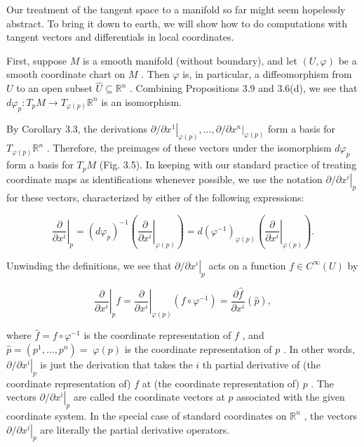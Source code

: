 \begin{definition}
\label{def:3-15-extra-1}
\leanok
{}
Our treatment of the tangent space to a manifold so far might seem hopelessly abstract. To bring it down to earth, we will show how to do computations with tangent vectors and differentials in local coordinates.

First, suppose $M$ is a smooth manifold (without boundary), and let $\left( {U,\varphi }\right)$ be a smooth coordinate chart on $M$ . Then $\varphi$ is, in particular, a diffeomorphism from $U$ to an open subset $\widehat{U} \subseteq  {\mathbb{R}}^{n}$ . Combining Propositions 3.9 and 3.6(d), we see that $d{\varphi }_{p} : {T}_{p}M \rightarrow  {T}_{\varphi \left( p\right) }{\mathbb{R}}^{n}$ is an isomorphism.

By Corollary 3.3, the derivations $\partial /{\left. \partial {x}^{1}\right| }_{\varphi \left( p\right) },\ldots ,\partial /{\left. \partial {x}^{n}\right| }_{\varphi \left( p\right) }$ form a basis for ${T}_{\varphi \left( p\right) }{\mathbb{R}}^{n}$ . Therefore, the preimages of these vectors under the isomorphism $d{\varphi }_{p}$ form a basis for ${T}_{p}M$ (Fig. 3.5). In keeping with our standard practice of treating coordinate maps as identifications whenever possible, we use the notation $\partial /{\left. \partial {x}^{i}\right| }_{p}$ for these vectors, characterized by either of the following expressions:

\[
{\left. \frac{\partial }{\partial {x}^{i}}\right| }_{p} = {\left( d{\varphi }_{p}\right) }^{-1}\left( {\left. \frac{\partial }{\partial {x}^{i}}\right| }_{\varphi \left( p\right) }\right)  = d{\left( {\varphi }^{-1}\right) }_{\varphi \left( p\right) }\left( {\left. \frac{\partial }{\partial {x}^{i}}\right| }_{\varphi \left( p\right) }\right) . \tag{3.8}
\]

Unwinding the definitions, we see that ${\left. \partial /\partial {x}^{i}\right| }_{p}$ acts on a function $f \in  {C}^{\infty }\left( U\right)$ by

\[
{\left. \frac{\partial }{\partial {x}^{i}}\right| }_{p}f = {\left. \frac{\partial }{\partial {x}^{i}}\right| }_{\varphi \left( p\right) }\left( {f \circ  {\varphi }^{-1}}\right)  = \frac{\partial \widehat{f}}{\partial {x}^{i}}\left( \widehat{p}\right) ,
\]

where $\widehat{f} = f \circ  {\varphi }^{-1}$ is the coordinate representation of $f$ , and $\widehat{p} = \left( {{p}^{1},\ldots ,{p}^{n}}\right)  = \; \varphi \left( p\right)$ is the coordinate representation of $p$ . In other words, $\partial /{\left. \partial {x}^{i}\right| }_{p}$ is just the derivation that takes the $i$ th partial derivative of (the coordinate representation of) $f$ at (the coordinate representation of) $p$ . The vectors $\partial /{\left. \partial {x}^{i}\right| }_{p}$ are called the coordinate vectors at $p$ associated with the given coordinate system. In the special case of standard coordinates on ${\mathbb{R}}^{n}$ , the vectors $\partial /{\left. \partial {x}^{i}\right| }_{p}$ are literally the partial derivative operators.


\end{definition}
